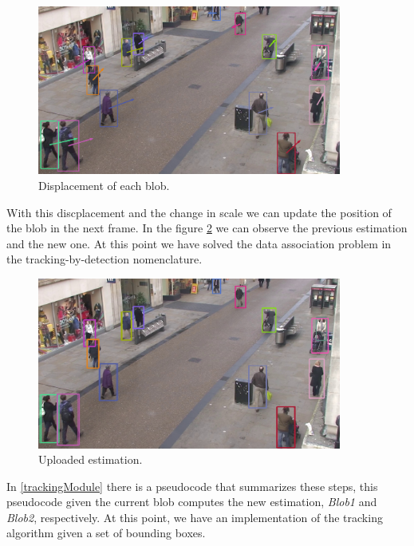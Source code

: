 \begin{figure}[H]
\centering         
\includegraphics[width=10cm]{intro/alcover2.png}
\caption{Displacement of each blob.} \label{solution5}
\end{figure}


With this discplacement and the change in scale we can update the position of the blob in the next frame. In the figure \ref{solution4} we can observe the previous estimation and the new one. At this point we have solved the data association problem in the tracking-by-detection nomenclature.


\begin{figure}[H]
\centering         
\includegraphics[width=10cm]{intro/deteccionsBLOB.jpg}
\caption{Uploaded estimation.} \label{solution4}
\end{figure}



In \ref{trackingModule} there is a pseudocode that summarizes these steps, this pseudocode given the current blob computes the new estimation, \textit{Blob1} and \textit{Blob2}, respectively. At this point, we have an implementation of the tracking algorithm given a set of bounding boxes.



